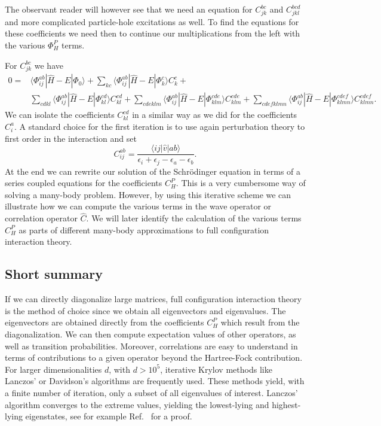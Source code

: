   The observant reader will however see that we need an equation for
  $C_{jk}^{bc}$ and $C_{jkl}^{bcd}$ and more complicated particle-hole excitations as well.  To find the equations for
  these coefficients we need then to continue our multiplications from
  the left with the various $\Phi_{H}^P$ terms.


  For $C_{jk}^{bc}$ we have
  \begin{align}\label{eq:c2p2h}
  0=&\langle \Phi_{ij}^{ab} | \hat{H} -E| \Phi_0\rangle +
  \sum_{kc}\langle \Phi_{ij}^{ab} | \hat{H} -E|\Phi_{k}^{c} \rangle
  C_{k}^{c}+ \\
  &\sum_{cdkl}\langle \Phi_{ij}^{ab} | \hat{H} -E|\Phi_{kl}^{cd}
  \rangle C_{kl}^{cd}+\sum_{cdeklm}\langle \Phi_{ij}^{ab} | \hat{H}
  -E|\Phi_{klm}^{cde} \rangle C_{klm}^{cde}+\sum_{cdefklmn}\langle
  \Phi_{ij}^{ab} | \hat{H} -E|\Phi_{klmn}^{cdef} \rangle
  C_{klmn}^{cdef}.
  \end{align}
  We can isolate the coefficients $C_{kl}^{cd}$ in a similar way
  as we did for the coefficients $C_{i}^{a}$.  A standard choice for
  the first iteration is to use again perturbation theory to first order in the interaction and set
  \[
  C_{ij}^{ab} =\frac{\langle ij \vert \hat{v} \vert ab
    \rangle}{\epsilon_i+\epsilon_j-\epsilon_a-\epsilon_b}.
  \]
  At the end we can rewrite our solution of the Schr\"odinger equation
  in terms of a series coupled equations for the coefficients $C_H^P$.
  This is a very cumbersome way of solving a many-body
  problem. However, by using this iterative scheme we can illustrate
  how we can compute the various terms in the wave operator or
  correlation operator $\hat{C}$. We will later identify the
  calculation of the various terms $C_H^P$ as parts of different
  many-body approximations to full configuration interaction theory.

  \subsection{Short summary}


  If we can directly diagonalize large matrices, full configuration interaction
  theory is the method of choice since  we obtain all  eigenvectors and eigenvalues. 
  The eigenvectors are obtained directly from the coefficients
    $C_H^P$ which result from the diagonalization.  We can then
compute expectation values of other operators,
    as well as transition probabilities. Moreover, correlations are easy to understand in terms of contributions
    to a given operator beyond the Hartree-Fock contribution. 
For larger dimensionalities $d$, with $d > 10^5$, iterative Krylov methods \cite{krylov} like Lanczos' \cite{lanczos} or Davidson's \cite{davidson} 
algorithms are frequently used. These methods yield, with a finite number of iteration, only a subset of all eigenvalues of interest. Lanczos' algorithm converges to the extreme values, yielding the lowest-lying and highest-lying eigenstates, see for example Ref.~\cite{golubvanloan} for a proof. 

